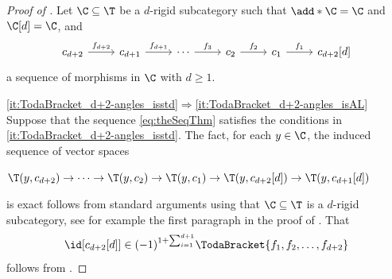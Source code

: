 \documentclass[a4paper]{amsart}
\begin{document}
\begin{proof}[Proof of ]
  Let $\C\subseteq\T$ be a $d$-rigid subcategory such that $\add*{\C}=\C$ and
  $\C[d]=\C$, and
  \begin{equation}
    \label{eq:theSeqThm}
    \begin{tikzcd}
      c_{d+2}\rar{f_{d+2}}&c_{d+1}\rar{f_{d+1}}&\cdots\rar{f_3}&c_2\rar{f_2}&c_1\rar{f_1}&c_{d+2}[d]
    \end{tikzcd}
  \end{equation}
  a sequence of morphisms in $\C$ with $d\geq1$.

  \eqref{it:TodaBracket_d+2-angles_isstd}$\Rightarrow$\eqref{it:TodaBracket_d+2-angles_isAL}
  Suppose that the sequence \eqref{eq:theSeqThm} satisfies the conditions in
  \eqref{it:TodaBracket_d+2-angles_isstd}. The
  fact, for each $y\in\C$, the induced sequence of vector spaces
  \begin{center}
    $\T(y,c_{d+2})\to\cdots\to\T(y,c_2)\to\T(y,c_1)\to\T(y,c_{d+2}[d])\to\T(y,c_{d+1}[d])$
  \end{center}
  is exact follows from standard arguments using that $\C\subseteq\T$ is a
  $d$-rigid subcategory, see for example the first paragraph in the proof of
  \cite[Lemma~4.6]{Lin19}. That
  \[
    \id[c_{d+2}[d]]\in(-1)^{1+\sum_{i=1}^{d+1}}\TodaBracket{f_1,f_2,\dots,f_{d+2}}
  \]
  follows from .


\end{proof}
\end{document}
